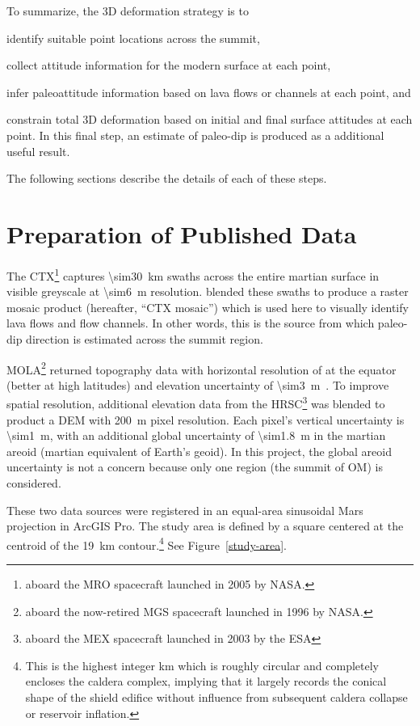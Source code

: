 To summarize, the 3D deformation strategy is to \begin{inparaenum}[a)]
    \item identify suitable point locations across the summit,
    \item collect attitude information for the modern surface at each point,
    \item infer paleoattitude information based on lava flows or channels at each point, and
    \item constrain total 3D deformation based on initial and final surface attitudes at each point. In this final step, an estimate of paleo-dip is produced as a additional useful result.
\end{inparaenum}
The following sections describe the details of each of these steps.

\section{Preparation of Published Data}
The \ac{CTX}\footnote{aboard the \ac{MRO} spacecraft launched in 2005 by \ac{NASA}.} captures \qty{\sim30}{\km} swaths across the entire martian surface in visible greyscale at \qty{\sim6}{\m} resolution. \textcite{Dickson2018AGB} blended these swaths to produce a raster mosaic product (hereafter, ``\ac{CTX} mosaic'') which is used here to visually identify lava flows and flow channels. In other words, this is the source from which paleo-dip direction is estimated across the summit region.

\ac{MOLA}\footnote{aboard the now-retired \ac{MGS} spacecraft launched in 1996 by \ac{NASA}.} returned topography data with horizontal resolution of  at the equator (better at high latitudes) and elevation uncertainty of \qty{\sim3}{\m}~\parencite{smith_mars_2001}. To improve spatial resolution, additional elevation data from the \ac{HRSC}\footnote{aboard the \ac{MEX} spacecraft launched in 2003 by the \ac{ESA}} was blended to product a \ac{DEM} with \qty{200}{\m} pixel resolution. Each pixel's vertical uncertainty is \qty{\sim1}{\m}, with an additional global uncertainty of \qty{\sim1.8}{\m} in the martian areoid (martian equivalent of Earth's geoid). In this project, the global areoid uncertainty is not a concern because only one region (the summit of \ac{OM}) is considered.

These two data sources were registered in an equal-area sinusoidal Mars projection in ArcGIS Pro. The study area is defined by a square  centered at the centroid of the \qty{19}{\km} contour.\footnote{This is the highest integer \unit{km} which is roughly circular and completely encloses the caldera complex, implying that it largely records the conical shape of the shield edifice without influence from subsequent caldera collapse or reservoir inflation.} See Figure~\ref{study-area}.

